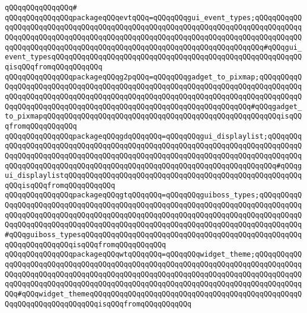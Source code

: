 \verb|qQQqqQQqqQQqqQQq#|\newline
\verb|qQQqqQQqqQQqqQQqpackageqQQqevtqQQq=qQQqqQQqgui_event_types;qQQqqQQqqQQqqQQqqQQqqQQqqQQqqQQqqQQqqQQqqQQqqQQqqQQqqQQqqQQqqQQqqQQqqQQqqQQqqQQqqQQqqQQqqQQqqQQqqQQqqQQqqQQqqQQqqQQqqQQqqQQqqQQqqQQqqQQqqQQqqQQqqQQqqQQqqQQqqQQqqQQqqQQqqQQqqQQqqQQqqQQqqQQqqQQqqQQqqQQqqQQqqQQqqQQq#qQQqgui_event_typesqQQqqQQqqQQqqQQqqQQqqQQqqQQqqQQqqQQqqQQqqQQqqQQqqQQqqQQqqQQqisqQQqfromqQQqqQQqqQQq|\newline
\verb|qQQqqQQqqQQqqQQqpackageqQQqg2pqQQq=qQQqqQQqgadget_to_pixmap;qQQqqQQqqQQqqQQqqQQqqQQqqQQqqQQqqQQqqQQqqQQqqQQqqQQqqQQqqQQqqQQqqQQqqQQqqQQqqQQqqQQqqQQqqQQqqQQqqQQqqQQqqQQqqQQqqQQqqQQqqQQqqQQqqQQqqQQqqQQqqQQqqQQqqQQqqQQqqQQqqQQqqQQqqQQqqQQqqQQqqQQqqQQqqQQqqQQqqQQqqQQqqQQq#qQQqgadget_to_pixmapqQQqqQQqqQQqqQQqqQQqqQQqqQQqqQQqqQQqqQQqqQQqqQQqqQQqqQQqisqQQqfromqQQqqQQqqQQq|\newline
\verb|qQQqqQQqqQQqqQQqpackageqQQqgdqQQqqQQq=qQQqqQQqgui_displaylist;qQQqqQQqqQQqqQQqqQQqqQQqqQQqqQQqqQQqqQQqqQQqqQQqqQQqqQQqqQQqqQQqqQQqqQQqqQQqqQQqqQQqqQQqqQQqqQQqqQQqqQQqqQQqqQQqqQQqqQQqqQQqqQQqqQQqqQQqqQQqqQQqqQQqqQQqqQQqqQQqqQQqqQQqqQQqqQQqqQQqqQQqqQQqqQQqqQQqqQQqqQQqqQQqqQQq#qQQqgui_displaylistqQQqqQQqqQQqqQQqqQQqqQQqqQQqqQQqqQQqqQQqqQQqqQQqqQQqqQQqqQQqisqQQqfromqQQqqQQqqQQq|\newline
\verb|qQQqqQQqqQQqqQQqpackageqQQqgtqQQqqQQq=qQQqqQQqguiboss_types;qQQqqQQqqQQqqQQqqQQqqQQqqQQqqQQqqQQqqQQqqQQqqQQqqQQqqQQqqQQqqQQqqQQqqQQqqQQqqQQqqQQqqQQqqQQqqQQqqQQqqQQqqQQqqQQqqQQqqQQqqQQqqQQqqQQqqQQqqQQqqQQqqQQqqQQqqQQqqQQqqQQqqQQqqQQqqQQqqQQqqQQqqQQqqQQqqQQqqQQqqQQqqQQqqQQqqQQqqQQq#qQQqguiboss_typesqQQqqQQqqQQqqQQqqQQqqQQqqQQqqQQqqQQqqQQqqQQqqQQqqQQqqQQqqQQqqQQqqQQqisqQQqfromqQQqqQQqqQQq|\newline
\verb|qQQqqQQqqQQqqQQqpackageqQQqwtqQQqqQQq=qQQqqQQqwidget_theme;qQQqqQQqqQQqqQQqqQQqqQQqqQQqqQQqqQQqqQQqqQQqqQQqqQQqqQQqqQQqqQQqqQQqqQQqqQQqqQQqqQQqqQQqqQQqqQQqqQQqqQQqqQQqqQQqqQQqqQQqqQQqqQQqqQQqqQQqqQQqqQQqqQQqqQQqqQQqqQQqqQQqqQQqqQQqqQQqqQQqqQQqqQQqqQQqqQQqqQQqqQQqqQQqqQQqqQQqqQQqqQQq#qQQqwidget_themeqQQqqQQqqQQqqQQqqQQqqQQqqQQqqQQqqQQqqQQqqQQqqQQqqQQqqQQqqQQqqQQqqQQqqQQqisqQQqfromqQQqqQQqqQQq|\newline
